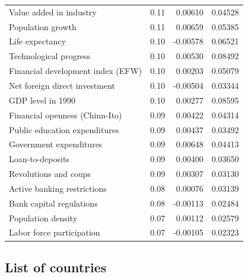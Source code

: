 \documentclass[a4paper,11pt]{article}
\begin{document}
\begin{table}[!ht]
\begin{tabular}{lrrr}
  Value added in industry & 0.11 & 0.00610 & 0.04528 \\ 
  Population growth & 0.11 & 0.00659 & 0.05385 \\ 
  Life expectancy & 0.10 & -0.00578 & 0.06521 \\ 
  Technological progress & 0.10 & 0.00530 & 0.08492 \\ 
  Financial development index (EFW) & 0.10 & 0.00203 & 0.05079 \\ 
  Net foreign direct investment & 0.10 & -0.00504 & 0.03344 \\ 
  GDP level in 1990 & 0.10 & 0.00277 & 0.08595 \\ 
  Financial openness (Chinn-Ito) & 0.09 & 0.00422 & 0.04314 \\ 
  Public education expenditures & 0.09 & 0.00437 & 0.03492 \\ 
  Government expenditures & 0.09 & 0.00648 & 0.04413 \\ 
  Loan-to-deposits & 0.09 & 0.00400 & 0.03650 \\ 
  Revolutions and coups & 0.09 & 0.00307 & 0.03130 \\ 
  Active banking restrictions & 0.08 & 0.00076 & 0.03139 \\ 
  Bank capital regulations & 0.08 & -0.00113 & 0.02484 \\ 
  Population density & 0.07 & 0.00112 & 0.02579 \\ 
  Labor force participation & 0.07 & -0.00105 & 0.02323 \\ 
  \midrule
  \bottomrule
\end{tabular}
\end{table}

%
%
\clearpage
\subsection*{List of countries}
\end{document}
